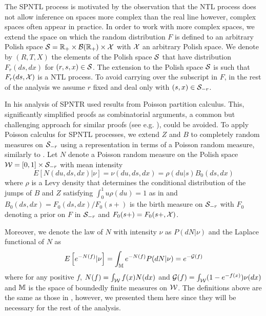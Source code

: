 The SPNTL process is motivated by the observation that the NTL process does not allow inference on spaces more complex than the real line however, complex spaces often appear in practice. In order to work with more complex spaces, we extend the space on which the random distribution $F$ is defined to an arbitrary Polish space $\mathcal{S} = \mathbb{R}_{+} \times \mathcal{B}(\mathbb{R}_{+}) \times \mathcal{X}$ with $\mathcal{X}$ an arbitrary Polish space. We denote by $(R, T, X)$ the elements of the Polish space $\mathcal{S}$ that have distribution $F_r(ds, dx)$ for $(r, s, x) \in \cal{S}$. The extension to the Polish space $\mathcal{S}$ is such that $F_r(ds, \mathcal{X})$ is a NTL process. To avoid carrying over the subscript in $F$, in the rest of the analysis we assume $r$ fixed and deal only with $(s, x) \in \mathcal{S}_{-r}$.

In his analysis of SPNTR \cite{james2006poisson} used results from Poisson partition calculus. This, significantly simplified proofs as combinatorial arguments, a common but challenging approach for similar proofs (see e.g. \cite{antoniak1974mixtures,pitman2002combinatorial}), could be avoided. To apply Poisson calculus for SPNTL processes, we extend $Z$ and $B$ to completely random measures on $\mathcal{S}_{-r}$ using a representation in terms of a Poisson random measure, similarly to \cite{james2006poisson}. Let $N$ denote a Poisson random measure on the Polish space $\mathcal{W} = [0,1] \times \mathcal{S}_{-r}$ with mean intensity 
\begin{equation*}
E[N(du, ds, dx) | \nu] = \nu(du, ds, dx) = \rho(du | s)B_0(ds, dx)
\end{equation*}
where $\rho$ is a Levy density that determines the conditional distribution of the jumps of $B$ and $Z$ satisfying $\int_0^1 u \rho(du) = 1$ as in \cite{james2006poisson} and $B_0(ds, dx) = F_0(ds, dx)/F_0(s+)$ is the birth measure on $\mathcal{S}_{-r}$ with $F_0$ denoting a prior on $F$ in $\mathcal{S}_{-r}$ and $F_0(s+) = F_0(s+, \mathcal{X})$.

Moreover, we denote the law of $N$ with intensity $\nu$ as $P(dN|\nu)$ and the Laplace functional of $N$ as
\begin{equation*}
E\left[e^{-N(f)}|\nu\right] = \int_{\mathbb{M}} e^{-N(f)}P(dN|\nu) = e^{-\mathcal{G}(f)}
\end{equation*}
where for any positive $f$, $N(f) = \int_{\mathcal{W}} f(x)N(dx)$ and $\mathcal{G}(f) =\int_{\mathcal{W}}(1-e^{-f(x)})\nu(dx)$ and $\mathbb{M}$ is the space of boundedly finite measures on $\cal{W}$. The definitions above are the same as those in \cite{james2006poisson}, however, we presented them here since they will be necessary for the rest of the analysis.

